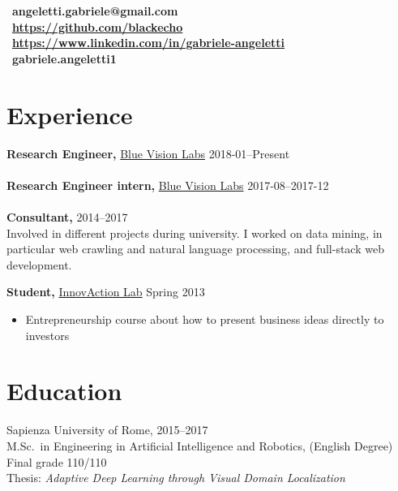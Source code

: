 \documentclass[margin]{res}
\begin{document}
    \address{235 Brick Lane \\ E2 7ED, London, UK  \\ (+44) 7803 056685}
    \begin{resume}
        \section{}
        \faEnvelope~\textbf{angeletti.gabriele@gmail.com} \\[5pt]
        \faGithub~\textbf{\url{https://github.com/blackecho}} \\[5pt]
        \faLinkedin~\textbf{\url{https://www.linkedin.com/in/gabriele-angeletti}} \\[5pt]
        \faSkype~\textbf{gabriele.angeletti1}

        \section{Experience}
            {\bf Research Engineer,} \href{http://www.bluevisionlabs.com}{Blue Vision Labs} \hfill 2018-01--Present\\
            \\
            {\bf Research Engineer intern,} \href{http://www.bluevisionlabs.com}{Blue Vision Labs} \hfill 2017-08--2017-12\\
            \\
            {\bf Consultant,} \hfill 2014--2017\\
            Involved in different projects during university. I worked on data mining,
            in particular web crawling and natural language processing, and full-stack web development.

            {\bf Student,} \href{http://www.innovactionlab.org/?lang=en}{InnovAction Lab} \hfill Spring 2013
            \begin{itemize} \itemsep-2pt
                \item Entrepreneurship course about how to present business ideas directly to investors
            \end{itemize}

        \section{Education}
            Sapienza University of Rome, \hfill 2015--2017 \\
            M.Sc.\ in Engineering in Artificial Intelligence and Robotics, (English Degree) \\
            Final grade 110/110 \\
            Thesis: \textit{Adaptive Deep Learning through Visual Domain Localization}


\end{resume}
\end{document}
